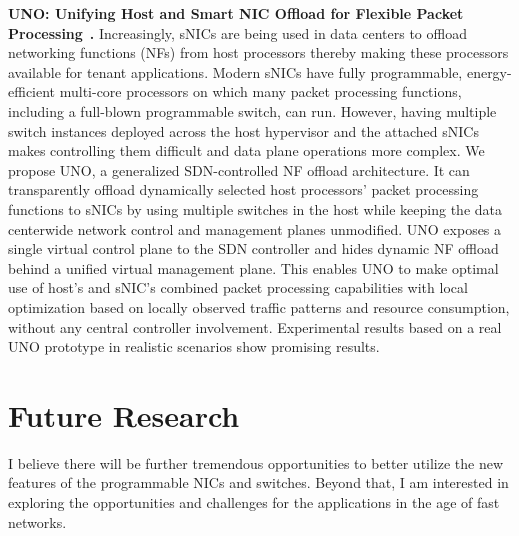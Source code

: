 \documentclass[10pt]{article}
\begin{document}
\textbf{UNO: Unifying Host and Smart NIC Offload for Flexible Packet
Processing}~\cite{uno:le}\textbf{.} Increasingly, sNICs are being used
in data centers to offload networking functions (NFs) from host
processors thereby making these processors available for tenant applications.
Modern sNICs have fully programmable, energy-efficient
multi-core processors on which many packet processing functions,
including a full-blown programmable switch, can run. However,
having multiple switch instances deployed across the host hypervisor
and the attached sNICs makes controlling them difficult and
data plane operations more complex.
We propose UNO, a generalized SDN-controlled NF offload
architecture. It can transparently offload dynamically
selected host processors’ packet processing functions to sNICs by
using multiple switches in the host while keeping the data centerwide
network control and management planes unmodified. UNO
exposes a single virtual control plane to the SDN controller and
hides dynamic NF offload behind a unified virtual management
plane. This enables UNO to make optimal use of host’s and sNIC’s
combined packet processing capabilities with local optimization
based on locally observed traffic patterns and resource consumption, 
without any central controller involvement. Experimental results
based on a real UNO prototype in realistic scenarios show promising
results.


\section*{Future Research}
I believe there will be further tremendous opportunities to better utilize the new features of the programmable NICs and switches. Beyond that, I am interested in exploring the opportunities and challenges for the applications in the age of fast networks. 
\end{document}
